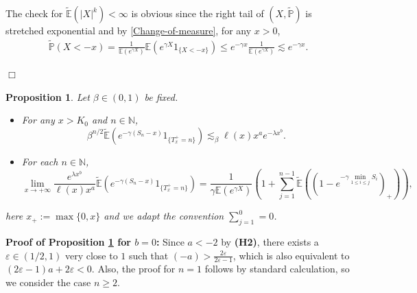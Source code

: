 \documentclass[11pt]{article}
\newtheorem{prop}[thrm]{Proposition}
\numberwithin{equation}{section}
\begin{document}
  The check for $\widetilde{\mathbb{E}}(|X|^k)<\infty$ is obvious since the right tail of $(X, \widetilde{\mathbb{P}})$ is stretched exponential and by \eqref{Change-of-measure}, for any $x>0$, 
  \begin{align}\label{left-tail-X}
  	\widetilde{\mathbb{P}}(X<-x) = \frac{1}{\mathbb{E}(e^{\gamma X})}\mathbb{E}(e^{\gamma X}1_{\{X<-x\}}) \leq  e^{-\gamma x}  \frac{1}{\mathbb{E}(e^{\gamma X})} \lesssim e^{-\gamma x}.
  \end{align}
 
 
 
 \hfill$\Box$

 
 
 
 

	\begin{prop}\label{prop2}
	Let $\beta \in (0,1)$ be fixed.
	\begin{itemize}
		\item[(i)] For any $x>K_0$ and $n\in\mathbb{N}$,
		\[
	      \beta^{n/2} \widetilde{\mathbb{E}}\left(e^{-\gamma (S_n-x)}1_{\{T_x^+=n\}}\right)  \lesssim_\beta   \ell(x)x^a e^{-\lambda x^b}.
		\]
		\item[(ii)] For each $n\in \mathbb{N}$,
		\[
		\lim_{x\to+\infty} \frac{ e^{\lambda x^b}}{ \ell(x)x^a } \widetilde{\mathbb{E}}\left(e^{-\gamma (S_n-x)}1_{\{T_x^+=n\}}\right)= \frac{1}{\gamma \mathbb{E}(e^{\gamma X})} \left(1+ \sum_{j=1}^{n-1}\widetilde{\mathbb{E}}\left( \left(1-e^{-\gamma \min_{1\leq i\leq j} S_i}\right)_+\right) \right),
		\]
	\end{itemize}
	here $x_+:= \max\{0,x\}$ and we adapt the convention $\sum_{j=1}^0 = 0$.
\end{prop}

\noindent
\textbf{Proof of Proposition \ref{prop2}  for $b=0$:}  
Since $a<-2$ by {\bf(H2)}, there exists a $\varepsilon\in (1/2,1)$ very close to $1$ such that $(-a)>\frac{2\varepsilon}{2\varepsilon -1}$, which is also equivalent to $(2\varepsilon-1)a+2\varepsilon<0$.   Also, the proof for $n=1$ follows by standard calculation, so we consider the case $n\geq 2$. 
\end{document}
